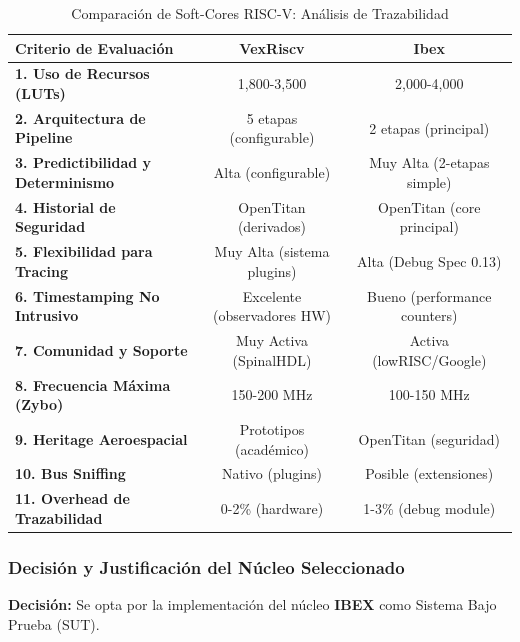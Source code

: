 \begin{table}[h!]
    \centering
    \caption{Comparación de Soft-Cores RISC-V: Análisis de Trazabilidad}
    \label{tab:comparacion_softcores}
    \begin{tabular}{|l|c|c|}
        \hline
        \textbf{Criterio de Evaluación} & \textbf{VexRiscv} & \textbf{Ibex} \\
        \hline
        \hline
        \textbf{1. Uso de Recursos (LUTs)} & 1,800-3,500 & 2,000-4,000 \\
        \hline
        \textbf{2. Arquitectura de Pipeline} & 5 etapas (configurable) & 2 etapas (principal) \\
        \hline
        \textbf{3. Predictibilidad y Determinismo} & Alta (configurable) & Muy Alta (2-etapas simple) \\
        \hline
        \textbf{4. Historial de Seguridad} & OpenTitan (derivados) & OpenTitan (core principal) \\
        \hline
        \textbf{5. Flexibilidad para Tracing} & Muy Alta (sistema plugins) & Alta (Debug Spec 0.13) \\
        \hline
        \textbf{6. Timestamping No Intrusivo} & Excelente (observadores HW) & Bueno (performance counters) \\
        \hline
        \textbf{7. Comunidad y Soporte} & Muy Activa (SpinalHDL) & Activa (lowRISC/Google) \\
        \hline
        \textbf{8. Frecuencia Máxima (Zybo)} & 150-200 MHz & 100-150 MHz \\
        \hline
        \textbf{9. Heritage Aeroespacial} & Prototipos (académico) & OpenTitan (seguridad) \\
        \hline
        \textbf{10. Bus Sniffing} & Nativo (plugins) & Posible (extensiones) \\
        \hline
        \textbf{11. Overhead de Trazabilidad} & 0-2\% (hardware) & 1-3\% (debug module) \\
        \hline
    \end{tabular}
\end{table}


\subsubsection{Decisión y Justificación del Núcleo Seleccionado}

\textbf{Decisión:} Se opta por la implementación del núcleo \textbf{IBEX} como Sistema Bajo Prueba (SUT).

